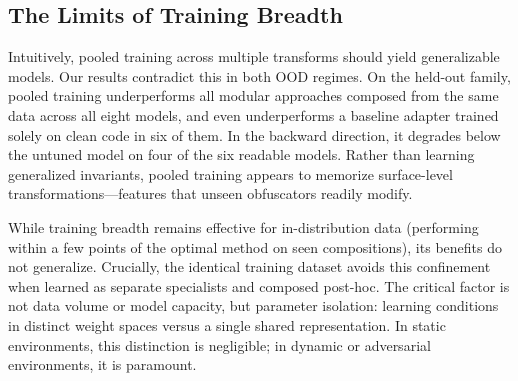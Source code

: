 \subsection{The Limits of Training Breadth}
Intuitively, pooled training across multiple transforms should yield generalizable models. Our results contradict this in both OOD regimes. On the held-out family, pooled training underperforms all modular approaches composed from the same data across all eight models, and even underperforms a baseline adapter trained solely on clean code in six of them. In the backward direction, it degrades below the untuned model on four of the six readable models. Rather than learning generalized invariants, pooled training appears to memorize surface-level transformations—features that unseen obfuscators readily modify.

While training breadth remains effective for in-distribution data (performing within a few points of the optimal method on seen compositions), its benefits do not generalize. Crucially, the identical training dataset avoids this confinement when learned as separate specialists and composed post-hoc. The critical factor is not data volume or model capacity, but parameter isolation: learning conditions in distinct weight spaces versus a single shared representation. In static environments, this distinction is negligible; in dynamic or adversarial environments, it is paramount.